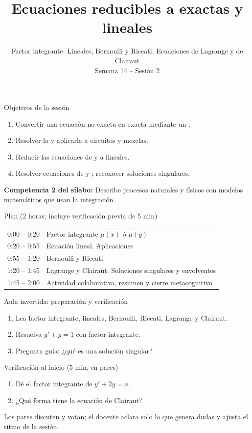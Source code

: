 \documentclass[10pt,aspectratio=169]{beamer}
\title[Factor integrante y lineales]{Ecuaciones reducibles a exactas y lineales}
\subtitle{Factor integrante. Lineales, Bernoulli y Riccati. Ecuaciones de Lagrange y de Clairaut\\[2pt]\small Semana 14 -- Sesión 2}
\begin{document}
\begin{frame}
  \titlepage
\end{frame}

\begin{frame}{Objetivos de la sesión}
  \begin{enumerate}
    \item Convertir una ecuación no exacta en exacta mediante un .
    \item Resolver la  y aplicarla a circuitos y mezclas.
    \item Reducir las ecuaciones de  y  a lineales.
    \item Resolver ecuaciones de  y ; reconocer soluciones singulares.
  \end{enumerate}
  \vspace{1mm}
  {\small\textbf{Competencia 2 del sílabo:} Describe procesos naturales y físicos con modelos matemáticos que usan la integración.}
  \begin{block}{Plan (2 horas; incluye verificación previa de 5 min)}
    \begin{tabular}{ll}
      0:00 -- 0:20 & Factor integrante $\mu(x)$ ó $\mu(y)$\\
      0:20 -- 0:55 & Ecuación lineal. Aplicaciones\\
      0:55 -- 1:20 & Bernoulli y Riccati\\
      1:20 -- 1:45 & Lagrange y Clairaut. Soluciones singulares y envolventes\\
      1:45 -- 2:00 & Actividad colaborativa, resumen y cierre metacognitivo
    \end{tabular}
  \end{block}
\end{frame}

\begin{frame}{Aula invertida: preparación y verificación}
  \small
  \begin{previa}
    \begin{enumerate}
      \item Lea factor integrante, lineales, Bernoulli, Riccati, Lagrange y Clairaut.
      \item Resuelva $y'+y=1$ con factor integrante.
      \item Pregunta guía: ¿qué es una solución singular?
    \end{enumerate}
  \end{previa}
  \begin{block}{Verificación al inicio (5 min, en pares)}
    \begin{enumerate}
      \item Dé el factor integrante de $y'+2y=x$.
      \item ¿Qué forma tiene la ecuación de Clairaut?
    \end{enumerate}
    Los pares discuten y votan; el docente aclara solo lo que genera dudas y ajusta el ritmo de la sesión.
  \end{block}
\end{frame}
\end{document}
